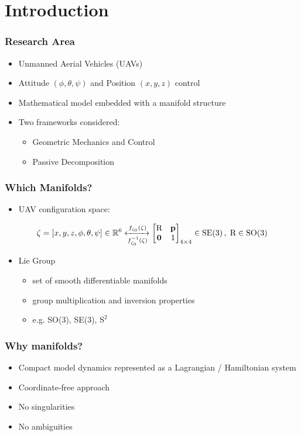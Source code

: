 
\section{Introduction}

\begin{frame}
	\frametitle{Research Area}
	
	\begin{itemize}
		\item Unmanned Aerial Vehicles (UAVs)
		\item Attitude $(\phi, \theta, \psi)$ and Position $(x, y, z)$ control
		\item Mathematical model embedded with a manifold structure
		\item Two frameworks considered:
		
		\begin{itemize}
			\item Geometric Mechanics and Control
			\item Passive Decomposition
		\end{itemize}
	\end{itemize}
\end{frame}

\begin{frame}
	\frametitle{Which Manifolds?}
	
	\begin{itemize}
		\item UAV configuration space:
	\end{itemize}
	
	\begin{equation*}
		\zeta = [x, y, z, \phi, \theta, \psi] \in \mathbb{R}^6 
		\xleftrightarrow[f_{\zeta_0}^{-1}(\zeta)]{f_{\zeta_0}(\zeta)}
		\begin{bmatrix}
		\text{R} & \textbf{p} \\
		\textbf{0} & 1
		\end{bmatrix}_{4\times 4} \in \text{SE(3)} \, , \; \text{R} \in \text{SO(3)}
	\end{equation*}
	
	\begin{itemize}
		\item Lie Group
		\begin{itemize}
			\item set of smooth differentiable manifolds
			\item group multiplication and inversion properties
			\item e.g. SO(3), SE(3), $\text{S}^2$
		\end{itemize}
	\end{itemize}
\end{frame}

\begin{frame}
	\frametitle{Why manifolds?}
	
	\begin{itemize}
		\item Compact model dynamics represented as a Lagrangian / Hamiltonian system
		\item Coordinate-free approach
		\item No singularities
		\item No ambiguities
	\end{itemize}
\end{frame}